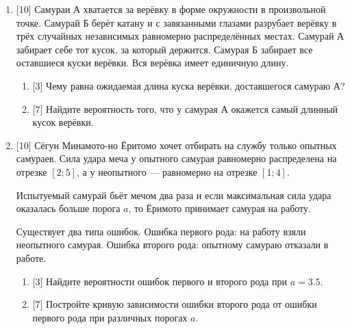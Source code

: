\documentclass[12pt]{article}
\begin{document}
\begin{enumerate}
    \item {[10]} Самураи А хватается за верёвку в форме окружности в произвольной точке.
    Самурай Б берёт катану и с завязанными глазами разрубает верёвку в трёх случайных независимых равномерно распределённых местах. 
    Самурай А забирает себе тот кусок, за который держится. 
    Самурая Б забирает все оставшиеся куски верёвки. 
    Вся верёвка имеет единичную длину.
      \begin{enumerate}
      \item {[3]} Чему равна ожидаемая длина куска верёвки, доставшегося самураю А?
      \item {[7]} Найдите вероятность того, что у самурая А окажется самый длинный кусок верёвки.
    \end{enumerate}
    
    \item {[10]} Сёгун Минамото-но Ёритомо хочет отбирать на службу только опытных самураев. 
    Сила удара меча у опытного самурая равномерно распределена на отрезке $[2; 5]$,
    а у неопытного — равномерно на отрезке $[1; 4]$.

    Испытуемый самурай бьёт мечом два раза и если максимальная сила удара оказалась больше порога $a$, то Ёримото принимает самурая на работу.

    Существует два типа ошибок. 
    Ошибка первого рода: на работу взяли неопытного самурая. 
    Ошибка второго рода: опытному самураю отказали в работе. 

    \begin{enumerate}
        \item {[3]} Найдите вероятности ошибок первого и второго рода при $a = 3.5$.
        \item {[7]} Постройте кривую зависимости ошибки второго рода от ошибки первого рода при различных порогах $a$.
    \end{enumerate}


\end{enumerate}
    
\end{document}
